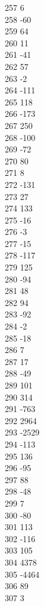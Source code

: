 { 257	6 \\
 258	-60 \\
 259	64 \\
 260	11 \\
 261	-41 \\
 262	57 \\
 263	-2 \\
 264	-111 \\
 265	118 \\
 266	-173 \\
 267	250 \\
 268	-100 \\
 269	-72 \\
 270	80 \\
 271	8 \\
 272	-131 \\
 273	27 \\
 274	133 \\
 275	-16 \\
 276	-3 \\
 277	-15 \\
 278	-117 \\
 279	125 \\
 280	-94 \\
 281	48 \\
 282	94 \\
 283	-92 \\
 284	-2 \\
 285	-18 \\
 286	7 \\
 287	17 \\
 288	-49 \\
 289	101 \\
 290	314 \\
 291	-763 \\
 292	2964 \\
 293	-2529 \\
 294	-113 \\
 295	136 \\
 296	-95 \\
 297	88 \\
 298	-48 \\
 299	7 \\
 300	-80 \\
 301	113 \\
 302	-116 \\
 303	105 \\
 304	4378 \\
 305	-4464 \\
 306	89 \\
 307	3 \\
}
